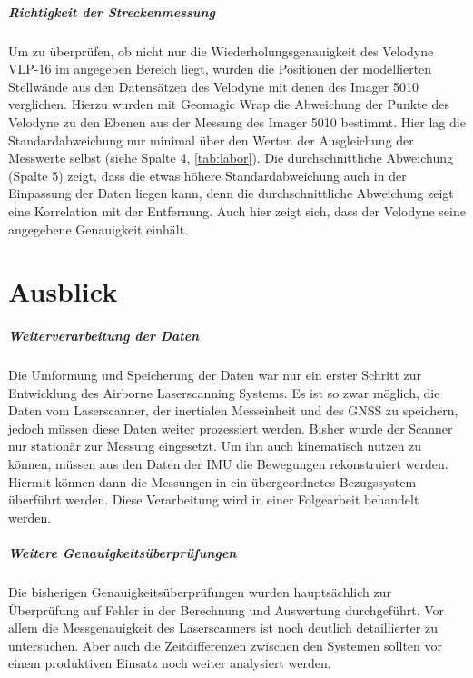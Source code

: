 \documentclass[a4paper,12pt,bibliography=totoc, listof=totoc,titlepage,pointlessnumbers]{scrreprt}
\begin{document}
\paragraph{Richtigkeit der Streckenmessung}
Um zu überprüfen, ob nicht nur die Wiederholungsgenauigkeit des Velodyne VLP-16 im angegeben Bereich liegt, wurden die Positionen der modellierten Stellwände aus den Datensätzen des Velodyne mit denen des Imager 5010 verglichen. Hierzu wurden mit Geomagic Wrap die Abweichung der Punkte des Velodyne zu den Ebenen aus der Messung des Imager 5010 bestimmt. Hier lag die Standardabweichung nur minimal über den Werten der Ausgleichung der Messwerte selbst (siehe Spalte 4, \autoref{tab:labor}). Die durchschnittliche Abweichung (Spalte 5) zeigt, dass die etwas höhere Standardabweichung auch in der Einpassung der Daten liegen kann, denn die durchschnittliche Abweichung zeigt eine Korrelation mit der Entfernung. Auch hier zeigt sich, dass der Velodyne seine angegebene Genauigkeit einhält.

\chapter{Ausblick}
\label{c:ausblick}

\paragraph{Weiterverarbeitung der Daten}
Die Umformung und Speicherung der Daten war nur ein erster Schritt zur Entwicklung des Air\-borne Laser\-scan\-ning Systems. Es ist so zwar möglich, die Daten vom Laser\-scan\-ner, der inertialen Messeinheit und des GNSS zu speichern, jedoch müssen diese Daten weiter prozessiert werden. Bisher wurde der Scanner nur stationär zur Messung eingesetzt. Um  ihn auch kinematisch nutzen zu können, müssen aus den Daten der IMU die Bewegungen rekonstruiert werden. Hiermit können dann die Messungen in ein übergeordnetes Bezugssystem überführt werden. Diese Verarbeitung wird in einer Folgearbeit behandelt werden.

\paragraph{Weitere Genauigkeitsüberprüfungen}
Die bisherigen Genauigkeitsüberprüfungen wurden hauptsächlich zur Überprüfung auf Fehler in der Berechnung und Auswertung durchgeführt. Vor allem die Messgenauigkeit des Laserscanners ist noch deutlich detaillierter zu untersuchen. Aber auch die Zeitdifferenzen zwischen den Systemen sollten vor einem produktiven Einsatz noch weiter analysiert werden.
\end{document}
